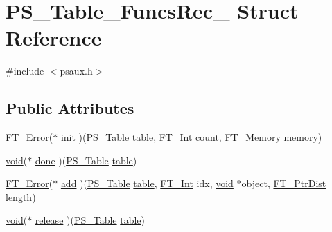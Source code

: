 \hypertarget{struct_p_s___table___funcs_rec__}{\section{P\-S\-\_\-\-Table\-\_\-\-Funcs\-Rec\-\_\- Struct Reference}
\label{struct_p_s___table___funcs_rec__}
}


{\ttfamily \#include $<$psaux.\-h$>$}

\subsection*{Public Attributes}
\begin{DoxyCompactItemize}
\item 
\hyperlink{fttypes_8h_a64c8060bdb3d6eec844a1bf670e06bdd}{F\-T\-\_\-\-Error}($\ast$ \hyperlink{struct_p_s___table___funcs_rec___ad0e795ae1e8a7040b7ef80d4a46e8d6a}{init} )(\hyperlink{psaux_8h_a4f28fe0f04a5112d1ffcebb1fb3bcef0}{P\-S\-\_\-\-Table} \hyperlink{glew_8h_ae45e70612085f6f870e2d650029e5510}{table}, \hyperlink{fttypes_8h_af90e5fb0d07e21be9fe6faa33f02484c}{F\-T\-\_\-\-Int} \hyperlink{_free_image_8h_a10b284d589000663becfbc6867a3a9f7}{count}, \hyperlink{ftsystem_8h_a67ec7ea35cde99a89a65e9f827a9ad3a}{F\-T\-\_\-\-Memory} memory)
\item 
\hyperlink{wglew_8h_aeea6e3dfae3acf232096f57d2d57f084}{void}($\ast$ \hyperlink{struct_p_s___table___funcs_rec___a33d660e1444fbe0ef35a87645f5831ad}{done} )(\hyperlink{psaux_8h_a4f28fe0f04a5112d1ffcebb1fb3bcef0}{P\-S\-\_\-\-Table} \hyperlink{glew_8h_ae45e70612085f6f870e2d650029e5510}{table})
\item 
\hyperlink{fttypes_8h_a64c8060bdb3d6eec844a1bf670e06bdd}{F\-T\-\_\-\-Error}($\ast$ \hyperlink{struct_p_s___table___funcs_rec___a38a0e111e48a877f52cce490362e4c91}{add} )(\hyperlink{psaux_8h_a4f28fe0f04a5112d1ffcebb1fb3bcef0}{P\-S\-\_\-\-Table} \hyperlink{glew_8h_ae45e70612085f6f870e2d650029e5510}{table}, \hyperlink{fttypes_8h_af90e5fb0d07e21be9fe6faa33f02484c}{F\-T\-\_\-\-Int} idx, \hyperlink{wglew_8h_aeea6e3dfae3acf232096f57d2d57f084}{void} $\ast$object, \hyperlink{fttypes_8h_a2469cb02129d36e468be22f7a8bf5b33}{F\-T\-\_\-\-Ptr\-Dist} \hyperlink{fmod__codec_8h_a921fa83f7755f0139c84ba1831417a2e}{length})
\item 
\hyperlink{wglew_8h_aeea6e3dfae3acf232096f57d2d57f084}{void}($\ast$ \hyperlink{struct_p_s___table___funcs_rec___a252959418225279f78e2ece7fc7705bd}{release} )(\hyperlink{psaux_8h_a4f28fe0f04a5112d1ffcebb1fb3bcef0}{P\-S\-\_\-\-Table} \hyperlink{glew_8h_ae45e70612085f6f870e2d650029e5510}{table})
\end{DoxyCompactItemize}


